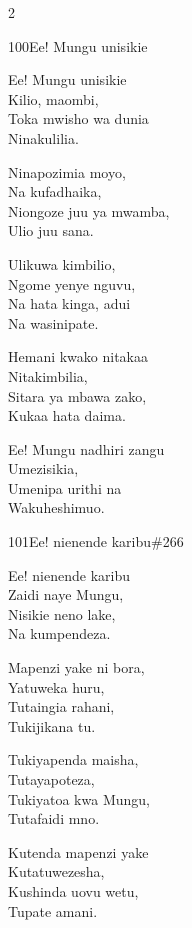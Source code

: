\documentclass{article}
\begin{document}
\begin{multicols}{2}
\begin{hymn}{100}{Ee! Mungu unisikie}{}
\begin{stanza}
Ee! Mungu unisikie\\
Kilio, maombi,\\
Toka mwisho wa dunia\\
Ninakulilia.
\end{stanza}
\begin{stanza}
Ninapozimia moyo,\\
Na kufadhaika,\\
Niongoze juu ya mwamba,\\
Ulio juu sana.
\end{stanza}
\begin{stanza}
Ulikuwa kimbilio,\\
Ngome yenye nguvu,\\
Na hata kinga, adui\\
Na wasinipate.
\end{stanza}
\begin{stanza}
Hemani kwako nitakaa\\
Nitakimbilia,\\
Sitara ya mbawa zako,\\
Kukaa hata daima.
\end{stanza}
\begin{stanza}
Ee! Mungu nadhiri zangu\\
Umezisikia,\\
Umenipa urithi na\\
Wakuheshimuo.
\end{stanza}
\end{hymn}

\begin{hymn}{101}{Ee! nienende karibu}{\#266}
\begin{stanza}
Ee! nienende karibu\\
Zaidi naye Mungu,\\
Nisikie neno lake,\\
Na kumpendeza.
\end{stanza}
\begin{stanza}
Mapenzi yake ni bora,\\
Yatuweka huru,\\
Tutaingia rahani,\\
Tukijikana tu.
\end{stanza}
\begin{stanza}
Tukiyapenda maisha,\\
Tutayapoteza,\\
Tukiyatoa kwa Mungu,\\
Tutafaidi mno.
\end{stanza}
\begin{stanza}
Kutenda mapenzi yake\\
Kutatuwezesha,\\
Kushinda uovu wetu,\\
Tupate amani.
\end{stanza}
\end{hymn}


\end{multicols}
\end{document}
